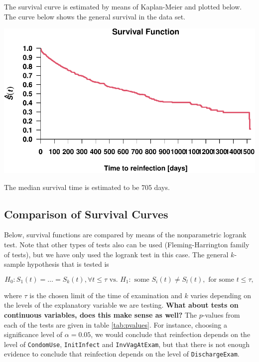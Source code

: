 \documentclass[
]{article}
\begin{document}
The survival curve is estimated by means of Kaplan-Meier and plotted below. The curve below shows the general survival in the data set.

\includegraphics{practical_files/figure-latex/unnamed-chunk-1-1.pdf}

The median survival time is estimated to be 705 days.

\hypertarget{comparison-of-survival-curves}{%
\subsection{Comparison of Survival Curves}\label{comparison-of-survival-curves}}

Below, survival functions are compared by means of the nonparametric logrank test. Note that other types of tests also can be used (Fleming-Harrington family of tests), but we have only used the logrank test in this case. The general \(k\)-sample hypothesis that is tested is

\begin{equation*}
        H_0: S_1(t) = \ldots = S_k(t), \forall t \leq \tau \text{ vs. } H_1: \text{ some } S_i(t) \neq S_l(t), \text{ for some } t \leq \tau,
\end{equation*}

where \(\tau\) is the chosen limit of the time of examination and \(k\) varies depending on the levels of the explanatory variable we are testing. \textbf{What about tests on continuous variables, does this make sense as well?} The \(p\)-values from each of the tests are given in table \ref{tab:pvalues}. For instance, choosing a significance level of \(\alpha = 0.05\), we would conclude that reinfection depends on the level of \texttt{CondomUse}, \texttt{InitInfect} and \texttt{InvVagAtExam}, but that there is not enough evidence to conclude that reinfection depends on the level of \texttt{DischargeExam}.
\end{document}
